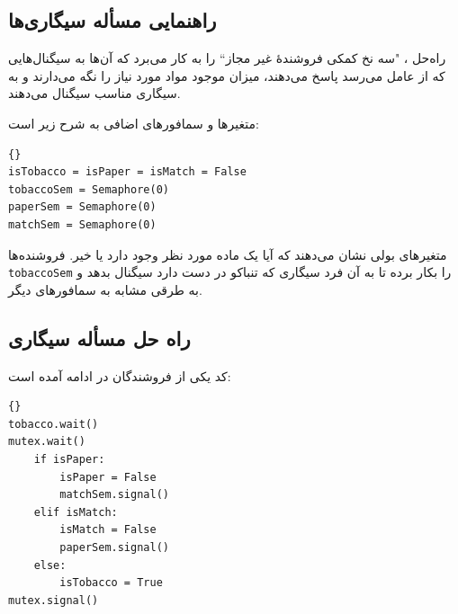\documentclass{book}
\newcommand{\clearemptydoublepage}{\newpage\cleardoublepage}
\begin{document}
\clearemptydoublepage
\subsection{راهنمایی مسأله سیگاری‌ها}

    راه‌حل ، "سه نخ کمکی فروشندهٔ غیر مجاز`` را به کار می‌برد که آن‌ها به سیگنال‌هایی که از عامل‌
    می‌رسد پاسخ می‌دهند، میزان موجود مواد مورد نیاز را نگه می‌دارند و به سیگاری مناسب سیگنال می‌دهند. 

    متغیرها و سمافورهای اضافی به شرح زیر است: 

\begin{latin}
\begin{lstlisting}[title=\rl{راهنمایی مسأله سیگاری‌ها}]{}
isTobacco = isPaper = isMatch = False
tobaccoSem = Semaphore(0)
paperSem = Semaphore(0)
matchSem = Semaphore(0)
\end{lstlisting}
\end{latin}

    متغیرهای بولی نشان می‌دهند که آیا یک ماده مورد نظر وجود دارد یا خیر. 
    فروشنده‌‌ها {\tt tobaccoSem} را بکار برده تا به آن فرد سیگاری که تنباکو در دست دارد سیگنال بدهد و به طرقی مشابه به سمافورهای دیگر. 


\clearemptydoublepage
\subsection{راه حل مسأله سیگاری}

    کد یکی از فروشندگان در ادامه آمده است:‌

\begin{latin}
\begin{lstlisting}[title=\rl{فروشنده \lr{A}}]{}
tobacco.wait()
mutex.wait()
    if isPaper:
        isPaper = False
        matchSem.signal()
    elif isMatch:
        isMatch = False
        paperSem.signal()
    else: 
        isTobacco = True
mutex.signal()
\end{lstlisting}
\end{latin}
\end{document}
